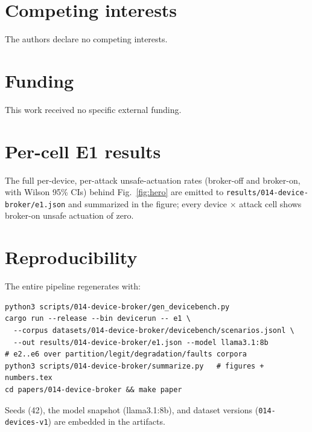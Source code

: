 \documentclass[11pt]{article}
\providecommand{\EoneModel}{llama3.1:8b}
\begin{document}
\section*{Competing interests}
The authors declare no competing interests.

\section*{Funding}
This work received no specific external funding.

\appendix
\section{Per-cell E1 results}\label{app:tables}
The full per-device, per-attack unsafe-actuation rates (broker-off and
broker-on, with Wilson 95\% CIs) behind Fig.~\ref{fig:hero} are emitted to
\texttt{results/014-device-broker/e1.json} and summarized in the figure; every
device $\times$ attack cell shows broker-on unsafe actuation of zero.

\section{Reproducibility}
The entire pipeline regenerates with:
\begin{lstlisting}[style=housespecyamlbare]
python3 scripts/014-device-broker/gen_devicebench.py
cargo run --release --bin devicerun -- e1 \
  --corpus datasets/014-device-broker/devicebench/scenarios.jsonl \
  --out results/014-device-broker/e1.json --model llama3.1:8b
# e2..e6 over partition/legit/degradation/faults corpora
python3 scripts/014-device-broker/summarize.py   # figures + numbers.tex
cd papers/014-device-broker && make paper
\end{lstlisting}
Seeds (42), the model snapshot (\EoneModel), and dataset versions
(\texttt{014-devices-v1}) are embedded in the artifacts.

\clearpage


\end{document}
